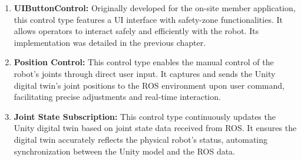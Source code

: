     \begin{enumerate}
        \item \textbf{UIButtonControl:} Originally developed for the on-site member application, this control type features a UI interface with safety-zone functionalities. It allows operators to interact safely and efficiently with the robot. Its implementation was detailed in the previous chapter.
        \item \textbf{Position Control:} This control type enables the manual control of the robot's joints through direct user input. It captures and sends the Unity digital twin's joint positions to the ROS environment upon user command, facilitating precise adjustments and real-time interaction.
        \item \textbf{Joint State Subscription:} This control type continuously updates the Unity digital twin based on joint state data received from ROS. It ensures the digital twin accurately reflects the physical robot's status, automating synchronization between the Unity model and the ROS data.
    \end{enumerate}
    
    
